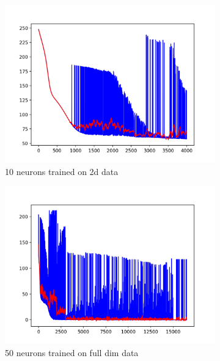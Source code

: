\documentclass[12pt, a4paper]{article}
\begin{document}
\begin{figure}[H]
    \centering
    \begin{subfigure}{0.3\textwidth}
        \includegraphics[width=\textwidth]{recursos/1/cost_10_2d}
        \caption{10 neurons trained on 2d data}
    \end{subfigure}
    \begin{subfigure}{0.3\textwidth}
        \includegraphics[width=\textwidth]{recursos/1/cost_50}
        \caption{50 neurons trained on full dim data}
    \end{subfigure}
    \begin{subfigure}{0.3\textwidth}

\end{subfigure}
\end{figure}
\end{document}
